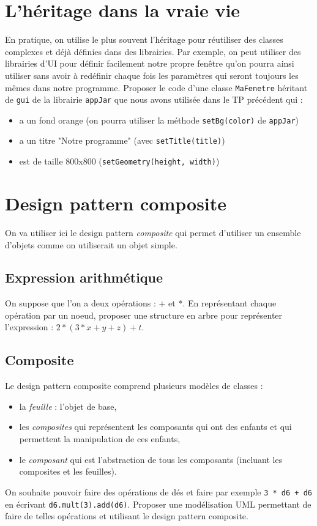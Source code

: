 \documentclass[12pt]{article}
\begin{document}
\section{L'héritage dans la vraie vie}
En pratique, on utilise le plus souvent l'héritage pour réutiliser des classes complexes et déjà définies dans des librairies. Par exemple, on peut utiliser des librairies d'UI pour définir facilement notre propre fenêtre qu'on pourra ainsi utiliser sans avoir à redéfinir chaque fois les paramètres qui seront toujours les mêmes dans notre programme. Proposer le code d'une classe \texttt{MaFenetre} héritant de \texttt{gui} de la librairie \texttt{appJar} que nous avons utilisée dans le TP précédent qui :
\begin{itemize}
	\item a un fond orange (on pourra utiliser la méthode \texttt{setBg(color)} de \texttt{appJar})
	\item a un titre "Notre programme" (avec \texttt{setTitle(title)})
	\item est de taille 800x800 (\texttt{setGeometry(height, width)})
\end{itemize}

\section{Design pattern composite}
On va utiliser ici le design pattern \emph{composite} qui permet d'utiliser un ensemble d'objets comme on utiliserait un objet simple.

\subsection{Expression arithmétique}
On suppose que l'on a deux opérations : + et *. En représentant chaque opération par un noeud, proposer une structure en arbre pour représenter l'expression : $2*(3*x+y+z)+t$.

\subsection{Composite}
Le design pattern composite comprend plusieurs modèles de classes :
\begin{itemize}
	\item la \emph{feuille} : l'objet de base,
	\item les \emph{composites} qui représentent les composants qui ont des enfants et qui permettent la manipulation de ces enfants,
	\item le \emph{composant} qui est l'abstraction de tous les composants (incluant les composites et les feuilles).
\end{itemize}
On souhaite pouvoir faire des opérations de dés et faire par exemple \texttt{3 * d6 + d6} en écrivant \texttt{d6.mult(3).add(d6)}. Proposer une modélisation UML permettant de faire de telles opérations et utilisant le design pattern composite.
\end{document}

